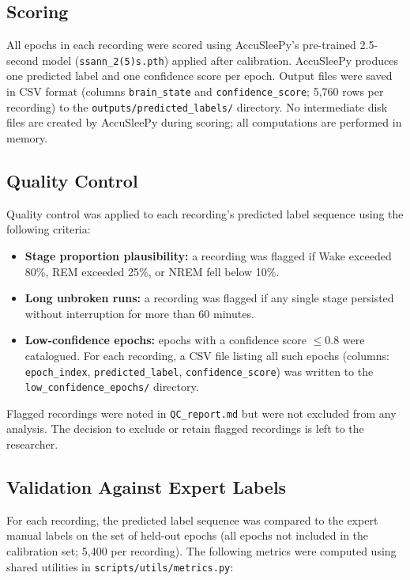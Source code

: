 \documentclass[12pt,a4paper]{article}
\begin{document}
\subsection{Scoring}

All epochs in each recording were scored using AccuSleePy's pre-trained
2.5-second model (\texttt{ssann\_2(5)s.pth}) applied after calibration.
AccuSleePy produces one predicted label and one confidence score per epoch.
Output files were saved in CSV format (columns \texttt{brain\_state} and
\texttt{confidence\_score}; 5,760 rows per recording) to the
\texttt{outputs/predicted\_labels/} directory. No intermediate disk files are
created by AccuSleePy during scoring; all computations are performed in memory.

\subsection{Quality Control}

Quality control was applied to each recording's predicted label sequence using
the following criteria:

\begin{itemize}
  \item \textbf{Stage proportion plausibility:} a recording was flagged if Wake
    exceeded 80\%, REM exceeded 25\%, or NREM fell below 10\%.
  \item \textbf{Long unbroken runs:} a recording was flagged if any single stage
    persisted without interruption for more than 60 minutes.
  \item \textbf{Low-confidence epochs:} epochs with a confidence score
    $\leq 0.8$ were catalogued. For each recording, a CSV file listing all
    such epochs (columns: \texttt{epoch\_index}, \texttt{predicted\_label},
    \texttt{confidence\_score}) was written to the
    \texttt{low\_confidence\_epochs/} directory.
\end{itemize}

Flagged recordings were noted in \texttt{QC\_report.md} but were not excluded
from any analysis. The decision to exclude or retain flagged recordings is left
to the researcher.

\subsection{Validation Against Expert Labels}

For each recording, the predicted label sequence was compared to the expert
manual labels on the set of held-out epochs (all epochs not included in the
calibration set; 5,400 per recording). The following metrics were
computed using shared utilities in \texttt{scripts/utils/metrics.py}:
\end{document}
